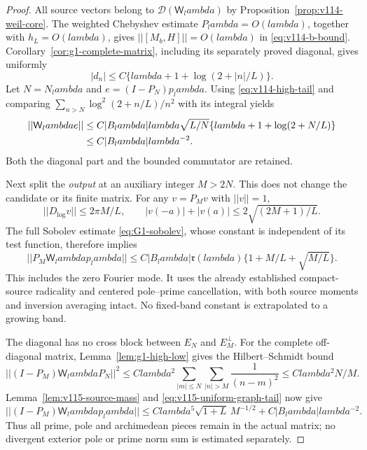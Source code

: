\documentclass[11pt]{article}
\def\lambda{lambda}%
\def\norm#1{||#1||}%
\theoremstyle{remark}
\newcommand{\norm}[1]{\left\lVert #1\right\rVert}
\begin{document}
\begin{proof}
All source vectors belong to $\mathcal D(\mathsf W_\lambda)$ by
Proposition~\ref{prop:v114-weil-core}. The weighted Chebyshev estimate
$P_\lambda=O(\lambda)$, together with $h_L=O(\lambda)$, gives
$\norm{[M_b,H]}=O(\lambda)$ in \eqref{eq:v114-b-bound}.
Corollary~\ref{cor:g1-complete-matrix}, including its separately proved
diagonal, gives uniformly
\[
 |d_n|\le C\{\lambda+1+\log(2+|n|/L)\}.
\]
Let $N=N_\lambda$ and $e=(I-P_N)p_\lambda$.
Using \eqref{eq:v114-high-tail} and comparing
$\sum_{n>N}\log^2(2+n/L)/n^2$ with its integral yields
\begin{align}
 \norm{\mathsf W_\lambda e}
 &\le C|B_\lambda|\lambda\sqrt{L/N}
        \{\lambda+1+\log(2+N/L)\}\notag\\
 &\le C|B_\lambda|\lambda^{-2}.
 \label{eq:v115-uniform-graph-tail}
\end{align}
Both the diagonal part and the bounded commutator are retained.

Next split the \emph{output} at an auxiliary integer $M>2N$.
This does not change the candidate or its finite matrix. For any
$v=P_Mv$ with $\norm v=1$,
\[
 \norm{D_{\log}v}\le2\pi M/L,\qquad
 |v(-a)|+|v(a)|\le2\sqrt{(2M+1)/L}.
\]
The full Sobolev estimate \eqref{eq:G1-sobolev}, whose constant is
independent of its test function, therefore implies
\begin{equation}\label{eq:v115-low-output}
 \norm{P_M\mathsf W_\lambda p_\lambda}
 \le C|B_\lambda|\mathfrak r(\lambda)
       \{1+M/L+\sqrt{M/L}\}.
\end{equation}
This includes the zero Fourier mode. It uses the already established
compact-source radicality and centered pole--prime cancellation, with
both source moments and inversion averaging intact. No fixed-band
constant is extrapolated to a growing band.

The diagonal has no cross block between $E_N$ and $E_M^\perp$.
For the complete off-diagonal matrix, Lemma~\ref{lem:g1-high-low}
gives the Hilbert--Schmidt bound
\[
 \norm{(I-P_M)\mathsf W_\lambda P_N}^2
 \le C\lambda^2\sum_{|m|\le N}\sum_{|n|>M}\frac1{(n-m)^2}
 \le C\lambda^2N/M.
\]
Lemma~\ref{lem:v115-source-mass} and
\eqref{eq:v115-uniform-graph-tail} now give
\begin{equation}\label{eq:v115-high-output}
 \norm{(I-P_M)\mathsf W_\lambda p_\lambda}
 \le C\lambda^5\sqrt{1+L}\,M^{-1/2}
         +C|B_\lambda|\lambda^{-2}.
\end{equation}
Thus all prime, pole and archimedean pieces remain in the actual matrix;
no divergent exterior pole or prime norm sum is estimated separately.


\end{proof}
\end{document}
